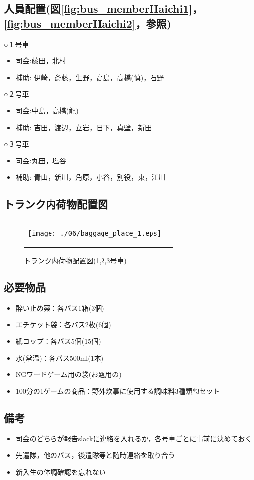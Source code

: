 \subsection{人員配置(図\ref{fig:bus_memberHaichi1}，\ref{fig:bus_memberHaichi2}，参照)}
○１号車
\begin{itemize}
\item 司会:藤田，北村
\item 補助: 伊崎，斎藤，生野，高島，高橋(慎)，石野
\end{itemize}
○２号車
\begin{itemize}
\item 司会:中島，高橋(龍)
\item 補助: 吉田，渡辺，立岩，日下，真壁，新田

\end{itemize}
○３号車
\begin{itemize}
\item 司会:丸田，塩谷
\item 補助: 青山，新川，角原，小谷，別役，東，江川

\end{itemize}


\subsection{トランク内荷物配置図}
\begin{figure}[H]
\begin{tabular}{lr}
\begin{minipage}{1.0\textwidth}
  \begin{center}
  \texttt{[image: ./06/baggage\_place\_1.eps]}
  \caption{トランク内荷物配置図(1,2,3号車)}
  \end{center}
\end{minipage}
\end{tabular}
\end{figure}

\subsection{必要物品}
\begin{itemize}
\item 酔い止め薬：各バス1箱(3個)
\item エチケット袋：各バス2枚(6個)
\item 紙コップ：各バス5個(15個)
\item 水(常温)：各バス500ml(1本)
\item NGワードゲーム用の袋(お題用の)
\item 100分の1ゲームの商品：野外炊事に使用する調味料3種類*3セット
\end{itemize}

\subsection{備考}

\begin{itemize}
\item 司会のどちらが報告slackに連絡を入れるか，各号車ごとに事前に決めておく
\item 先遣隊，他のバス，後遣隊等と随時連絡を取り合う
\item 新入生の体調確認を忘れない
\end{itemize}


